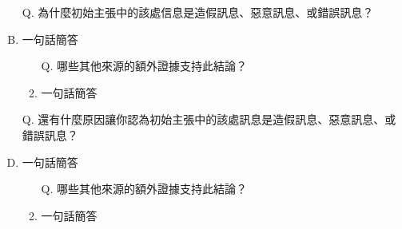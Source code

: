 \documentclass[a4paper, 12pt]{article}
\begin{document}
\begin{enumerate}[I.]
          \begin{enumerate}[A.]
              \item [Q.]為什麼{\color{blue}初始主張}中的該處信息是造假訊息、惡意訊息、或錯誤訊息？
              \item {\color{gray}一句話簡答} %
                    \begin{enumerate}[1.]
                        \item [Q.]哪些其他來源的額外證據支持此結論？
                        \item {\color{gray}一句話簡答} %
                    \end{enumerate}
              \item [Q.]還有什麼原因讓你認為{\color{blue}初始主張}中的該處訊息是造假訊息、惡意訊息、或錯誤訊息？
              \item {\color{gray}一句話簡答} %
                    \begin{enumerate}[1.]
                        \item [Q.]哪些其他來源的額外證據支持此結論？
                        \item {\color{gray}一句話簡答} %
                    \end{enumerate}
          \end{enumerate}
\end{enumerate}

\end{document}

